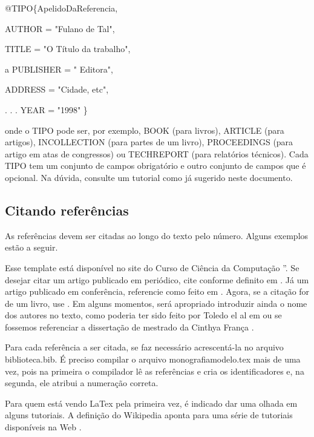\bigskip


@TIPO\{ApelidoDaReferencia,

AUTHOR = "Fulano de Tal",

TITLE = "O Título da  trabalho",

a PUBLISHER = " Editora",

ADDRESS = "Cidade, etc",

. . . YEAR = "1998" \}

\bigskip
\noindent onde o TIPO pode ser, por exemplo, BOOK (para livros),
ARTICLE (para artigos), INCOLLECTION (para partes de um livro),
PROCEEDINGS (para artigo em atas de congressos) ou TECHREPORT (para
relatórios técnicos).  Cada TIPO tem um conjunto de campos
obrigatório e outro conjunto de campos que é opcional. Na dúvida,
consulte um tutorial como já sugerido neste documento.

\subsection{Citando referências}

As referências devem ser citadas ao longo do texto pelo número. Alguns exemplos estão a seguir.

Esse template está disponível no site do Curso de Ciência da Computação \cite{IC}''. Se desejar citar um artigo publicado em periódico, cite conforme definito em \cite{Rocha:NomeDoPeriodico2013}. Já um artigo publicado em conferência, referencie como feito em \cite{Franca:NomeDaConferencia2012}. Agora, se a citação for de um livro, use \cite{Toledo:NomeDoLivro2011}. Em alguns momentos, será apropriado introduzir ainda o nome dos autores no texto, como poderia ter sido feito por Toledo el al em \cite{Toledo:NomeDoLivro2011} ou se fossemos referenciar a dissertação de mestrado da Cinthya França \cite{Franca:MSc2013}.

Para cada referência a ser citada, se faz necessário acrescentá-la no arquivo biblioteca.bib. É preciso compilar o arquivo monografiamodelo.tex mais de uma vez, pois na primeira o compilador lê as referências e cria os identificadores e, na segunda, ele atribui a numeração correta.

Para quem está vendo LaTex pela primeira vez, é indicado dar uma olhada em alguns tutoriais. A definição do Wikipedia aponta para uma série de tutoriais disponíveis na Web \cite{WikipediaLatex}.
